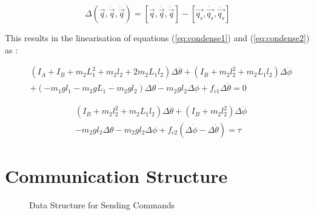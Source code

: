 \begin{equation}
\label{eq:workingpoint}
\Delta( \vec{q}, \dot{ \vec{q} }, \ddot{ \vec{q} }) =  [\vec{q}, \dot{ \vec{q} }, \ddot{ \vec{q} }] - [\vec{q_{s}},\dot{\vec{q_{s}}},\ddot{\vec{q_{s}}}]
\end{equation}

This results in the linearisation of equations (\ref{eq:condense1}) and (\ref{eq:condense2}) as :

\begin{equation}
\begin{split}
&(I_{A} + I_{B} + m_{2}L_{1}^2+m_{2}l_{2}+2m_{2}L_{1}l_{2})\Delta\ddot{\theta} + (I_{B}+m_{2}l_{2}^2+m_{2}L_{1}l_{2})\Delta\ddot{\phi}\\
&+(-m_{1}gl_{1}-m_{2}gL_{1}-m_{2}gl_{2})\Delta\theta -m_{2}gl_{2}\Delta\phi + f_{c1}\Delta\dot{\theta} = 0
\end{split}
\end{equation}

\begin{equation}
\begin{split}
&(I_{B}+m_{2}l_{2}^2+m_{2}L_{1}l_{2})\Delta\ddot{\theta} + (I_{B}+m_{2}l_{2}^2)\Delta\ddot{\phi}\\
& -m_{2}gl_{2}\Delta\theta -m_{2}gl_{2}\Delta\phi +f_{c2}(\Delta\dot{\phi}-\Delta\dot{\theta}) = \tau
\end{split}
\end{equation}



















\section{Communication Structure}
\label{sec:software_requirements}
\begin{figure}[h]
	\centering
	
	\caption{Data Structure for Sending Commands}
	\label{fig:uart_struct_app}
\end{figure}

